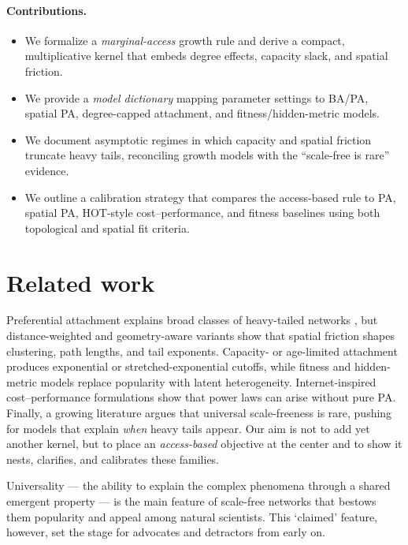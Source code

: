 \documentclass{article}[12pt]
\begin{document}
\paragraph{Contributions.} 
\begin{itemize}
    \item  We formalize a \emph{marginal-access} growth rule and derive a compact, multiplicative kernel that embeds degree effects, capacity slack, and spatial friction. 
    \item We provide a \emph{model dictionary} mapping parameter settings to BA/PA, spatial PA, degree-capped attachment, and fitness/hidden-metric models. 
    \item  We document asymptotic regimes in which capacity and spatial friction truncate heavy tails, reconciling growth models with the ``scale-free is rare'' evidence. 
    \item  We outline a calibration strategy that compares the access-based rule to PA, spatial PA, HOT-style cost--performance, and fitness baselines using both topological and spatial fit criteria.
\end{itemize}

\section{Related work}
Preferential attachment explains broad classes of heavy-tailed networks \citep{barabasi1999emergence}, but distance-weighted and geometry-aware variants show that spatial friction shapes clustering, path lengths, and tail exponents. Capacity- or age-limited attachment produces exponential or stretched-exponential cutoffs, while fitness and hidden-metric models replace popularity with latent heterogeneity. Internet-inspired cost--performance formulations show that power laws can arise without pure PA. Finally, a growing literature argues that universal scale-freeness is rare, pushing for models that explain \emph{when} heavy tails appear.  Our aim is not to add yet another kernel, but to place an \emph{access-based} objective at the center and to show it nests, clarifies, and calibrates these families.

Universality — the ability to explain the complex phenomena through a shared emergent property — is the main feature of scale-free networks that bestows them  popularity and appeal among natural scientists.  This `claimed' feature, however, set the stage for advocates and detractors from early on. 
\end{document}
